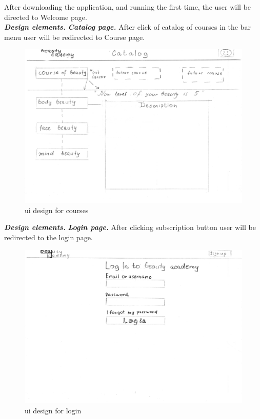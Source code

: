 \documentclass{scrartcl}
\begin{document}
After downloading the application, and running the first time, the user will be directed to Welcome page.\\

\textbf{\textit{Design elements.}}
\textbf{\textit{Catalog page.}}
After click of catalog of courses in the bar menu user will be redirected to Course page.

\begin{figure}[H]
\centering
\includegraphics[width = 140mm]{proto-foto/ui-courses.JPG}
\caption{ui design for courses}
\label{welcome page}
\end{figure}

\textbf{\textit{Design elements.}}
\textbf{\textit{Login page. }}
After clicking subscription button user will be redirected to the login page.
\begin{figure}[H]
\centering
\includegraphics[width = 140mm]{proto-foto/ui-login.JPG}
\caption{ui design for login}
\label{login page}
\end{figure}
\end{document}

